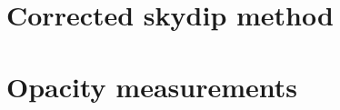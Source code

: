




\section{Corrected skydip method}
\label{se:corrected-skydip}




\section{Opacity measurements}
\label{se:opacity_correction}




